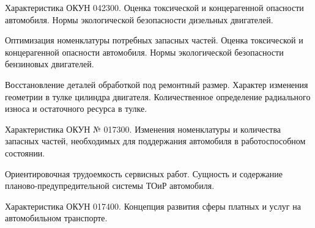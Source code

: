 \documentclass[
	14pt,
	a4paper,
	]
	{scrartcl}
\begin{document}
\vfill

\newpage


\shapk
{}
\setcounter{zad}{0}

\vfill
\z Характеристика ОКУН 042300.
 \vfill
\z Оценка токсической и концерагенной опасности автомобиля. Нормы экологической безопасности дизельных двигателей.
 \vfill

\vfill

\newpage


\shapk
{}
\setcounter{zad}{0}

\vfill
\z Оптимизация номенклатуры потребных запасных частей.
 \vfill
\z Оценка токсической и концерагенной опасности автомобиля. Нормы экологической безопасности бензиновых двигателей.
 \vfill

\vfill

\newpage


\shapk
{}
\setcounter{zad}{0}

\vfill
\z Восстановление деталей обработкой под ремонтный размер.
 \vfill
\z Характер изменения геометрии в тулке цилиндра двигателя. Количественное определение радиального износа и остаточного ресурса в тулке.
 \vfill

\vfill

\newpage


\shapk
{}
\setcounter{zad}{0}

\vfill
\z Характеристика ОКУН № 017300.
 \vfill
\z Изменения номенклатуры и количества запасных частей, необходимых для поддержания автомобиля в работоспособном состоянии.
 \vfill

\vfill

\newpage


\shapk
{}
\setcounter{zad}{0}

\vfill
\z Ориентировочная трудоемкость сервисных работ.
 \vfill
\z Сущность и содержание планово-предупредительной системы ТОиР автомобиля.
 \vfill

\vfill

\newpage


\shapk
{}
\setcounter{zad}{0}

\vfill
\z Характеристика ОКУН 017400.
 \vfill
\z Концепция развития сферы платных и услуг на автомобильном транспорте.
 \vfill

\vfill

\newpage


\shapk
{}
\setcounter{zad}{0}
\end{document}
